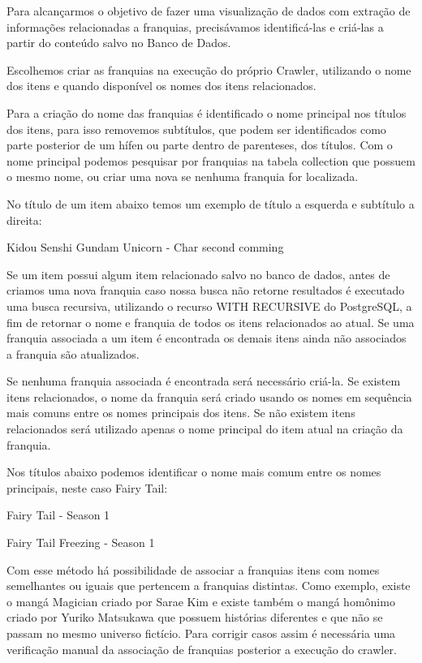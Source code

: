 \documentclass[12pt]{article}
\begin{document}
Para alcançarmos o objetivo de fazer uma visualização de dados com extração de informações relacionadas a franquias, precisávamos identificá-las e criá-las a partir do conteúdo salvo no Banco de Dados. 

Escolhemos criar as franquias na execução do próprio Crawler, utilizando o nome dos itens e quando disponível os nomes dos itens relacionados.

Para a criação do nome das franquias é identificado o nome principal nos títulos dos itens, para isso removemos subtítulos, que podem ser identificados como parte posterior de um hífen ou parte dentro de parenteses, dos títulos. Com o nome principal podemos pesquisar por franquias na tabela collection que possuem o mesmo nome, ou criar uma nova se nenhuma franquia for localizada.

No título de um item abaixo temos um exemplo de título a esquerda e subtítulo a direita:

Kidou Senshi Gundam Unicorn - Char second comming

Se um item possui algum item relacionado salvo no banco de dados, antes de criamos uma nova franquia caso nossa busca não retorne resultados é executado uma busca recursiva, utilizando o recurso WITH RECURSIVE do PostgreSQL, a fim de retornar o nome e franquia de todos os itens relacionados ao atual. Se uma franquia associada a um item é encontrada os demais itens ainda não associados a franquia são atualizados.

Se nenhuma franquia associada é encontrada será necessário criá-la. Se existem itens relacionados, o nome da franquia será criado usando os nomes em sequência mais comuns entre os nomes principais dos itens. Se não existem itens relacionados será utilizado apenas o nome principal do item atual na criação da franquia.

Nos títulos abaixo podemos identificar o nome mais comum entre os nomes principais, neste caso Fairy Tail:
 
Fairy Tail - Season 1

Fairy Tail Freezing - Season 1 


Com esse método há possibilidade de associar a franquias itens com nomes semelhantes ou iguais que pertencem a franquias distintas. Como exemplo, existe o mangá Magician criado por Sarae Kim e existe também o mangá homônimo criado por Yuriko Matsukawa que possuem histórias diferentes e que não se passam no mesmo universo fictício. Para corrigir casos assim é necessária uma verificação manual da associação de franquias posterior a execução do crawler.
\end{document}
